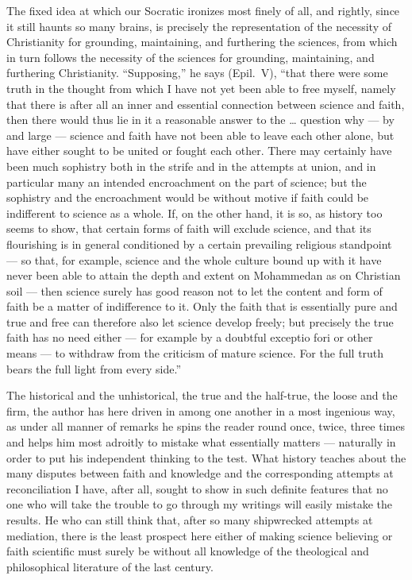 \documentclass[12pt]{book}
\newcommand{\opage}[1]{\marginnote{\footnotesize\textit{[#1]}}}
\begin{document}
The fixed idea at which our Socratic ironizes most finely of all, and
rightly, since it still haunts
\opage{319}\setcounter{footnote}{0}%
so many brains, is precisely the representation of the necessity of
Christianity for grounding, maintaining, and furthering the sciences,
from which in turn follows the necessity of the sciences for grounding,
maintaining, and furthering Christianity. ``Supposing,'' he says (Epil.\
V), ``that there were some truth in the thought from which I have not yet
been able to free myself, namely that there is after all an inner and
essential connection between science and faith, then there would thus lie
in it a reasonable answer to the \ldots{} question why --- by and large
--- science and faith have not been able to leave each other alone, but
have either sought to be united or fought each other. There may certainly
have been much sophistry both in the strife and in the attempts at union,
and in particular many an intended encroachment on the part of science;
but the sophistry and the encroachment would be without motive if faith
could be indifferent to science as a whole. If, on the other hand, it is
so, as history too seems to show, that certain forms of faith will exclude
science, and that its flourishing is in general conditioned by a certain
prevailing religious standpoint --- so that, for example, science and the
whole culture bound up with it have never been able to attain the depth
and extent on Mohammedan as on Christian soil --- then science surely has
good reason not to let the content and form of faith be a matter of
indifference to it. Only the faith that is essentially pure and true and
free can therefore also let science develop freely; but precisely the
true faith has no need either --- for example by a doubtful exceptio fori
or other means --- to withdraw from the criticism of mature science. For
the full truth bears the full light from every side.''

The historical and the unhistorical, the true and the half-true, the loose
and the firm, the author has here driven in among one another in a most
ingenious way, as under all manner of remarks he spins the reader round
once, twice, three times and helps him most adroitly to mistake what
essentially matters --- naturally in order to put his
\opage{320}\setcounter{footnote}{0}%
independent thinking to the test. What history teaches about the many
disputes between faith and knowledge and the corresponding attempts at
reconciliation I have, after all, sought to show in such definite
features that no one who will take the trouble to go through my writings
will easily mistake the results. He who can still think that, after so
many shipwrecked attempts at mediation, there is the least prospect here
either of making science believing or faith scientific must surely be
without all knowledge of the theological and philosophical literature of
the last century.
\end{document}
